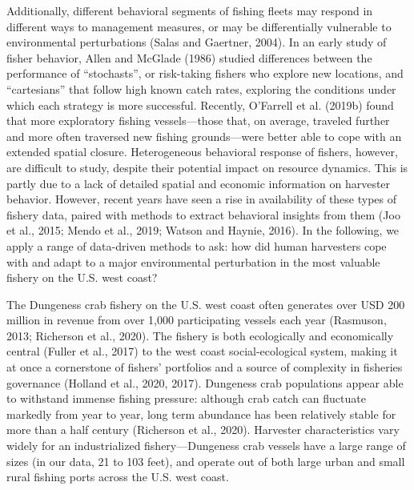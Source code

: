 \documentclass[]{elsarticle} %
\begin{document}
Additionally, different behavioral segments of fishing fleets may
respond in different ways to management measures, or may be
differentially vulnerable to environmental perturbations (Salas and
Gaertner, 2004). In an early study of fisher behavior, Allen and McGlade
(1986) studied differences between the performance of ``stochasts'', or
risk-taking fishers who explore new locations, and ``cartesians'' that
follow high known catch rates, exploring the conditions under which each
strategy is more successful. Recently, O'Farrell et al. (2019b) found
that more exploratory fishing vessels---those that, on average, traveled
further and more often traversed new fishing grounds---were better able
to cope with an extended spatial closure. Heterogeneous behavioral
response of fishers, however, are difficult to study, despite their
potential impact on resource dynamics. This is partly due to a lack of
detailed spatial and economic information on harvester behavior.
However, recent years have seen a rise in availability of these types of
fishery data, paired with methods to extract behavioral insights from
them (Joo et al., 2015; Mendo et al., 2019; Watson and Haynie, 2016). In
the following, we apply a range of data-driven methods to ask: how did
human harvesters cope with and adapt to a major environmental
perturbation in the most valuable fishery on the U.S. west coast?

The Dungeness crab fishery on the U.S. west coast often generates over
USD 200 million in revenue from over 1,000 participating vessels each
year (Rasmuson, 2013; Richerson et al., 2020). The fishery is both
ecologically and economically central (Fuller et al., 2017) to the west
coast social-ecological system, making it at once a cornerstone of
fishers' portfolios and a source of complexity in fisheries governance
(Holland et al., 2020, 2017). Dungeness crab populations appear able to
withstand immense fishing pressure: although crab catch can fluctuate
markedly from year to year, long term abundance has been relatively
stable for more than a half century (Richerson et al., 2020). Harvester
characteristics vary widely for an industrialized fishery---Dungeness
crab vessels have a large range of sizes (in our data, 21 to 103 feet),
and operate out of both large urban and small rural fishing ports across
the U.S. west coast.
\end{document}
